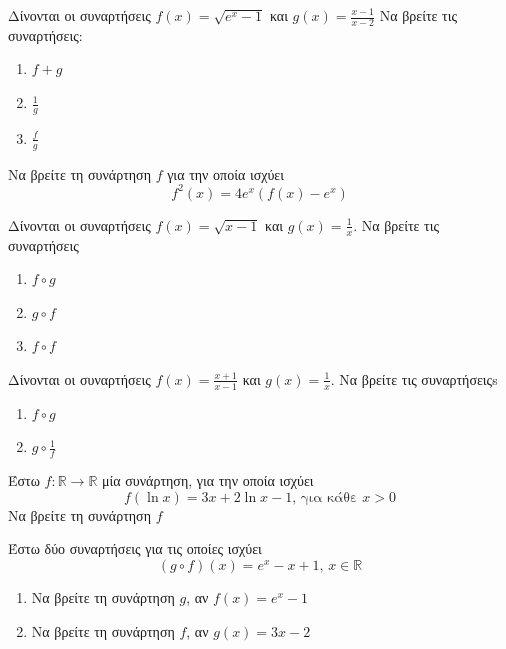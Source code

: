 \documentclass{presentation}
\begin{document}
\begin{askisi}
  Δίνονται οι συναρτήσεις $f(x)=\sqrt{e^x-1}$ και $g(x)=\frac{x-1}{x-2}$
  Να βρείτε τις συναρτήσεις:
  \begin{enumerate}
    \item<1-> $f+g$
    \item<2-> $\frac{1}{g}$
    \item<3-> $\frac{f}{g}$
  \end{enumerate}

\end{askisi}

\begin{askisi}
  Να βρείτε τη συνάρτηση $f$ για την οποία ισχύει
  $$f^2(x)=4e^x\left(f(x)-e^x\right)$$

\end{askisi}

\begin{askisi}
  Δίνονται οι συναρτήσεις $f(x)=\sqrt{x-1}$ και $g(x)=\frac{1}{x}$. Να βρείτε τις συναρτήσεις
  \begin{enumerate}
    \item<1-> $f\circ g$
    \item<2-> $g\circ f$
    \item<3-> $f\circ f$
  \end{enumerate}

\end{askisi}

\begin{askisi}
  Δίνονται οι συναρτήσεις $f(x)=\frac{x+1}{x-1}$ και $g(x)=\frac{1}{x}$. Να βρείτε τις συναρτήσειςs
  \begin{enumerate}
    \item<1-> $f\circ g$
    \item<2-> $g\circ \frac{1}{f}$
  \end{enumerate}

\end{askisi}

\begin{askisi}
  Έστω $f:\mathbb{R}\to\mathbb{R}$ μία συνάρτηση, για την οποία ισχύει
  $$f(\ln x)=3x+2\ln x -1\text{, για κάθε } x>0$$
  Να βρείτε τη συνάρτηση $f$

\end{askisi}

\begin{askisi}
  Έστω δύο συναρτήσεις για τις οποίες ισχύει
  $$(g\circ f)(x)=e^x-x+1\text{, } x\in\mathbb{R}$$
  \begin{enumerate}
    \item<1-> Να βρείτε τη συνάρτηση $g$, αν $f(x)=e^x-1$
    \item<2-> Να βρείτε τη συνάρτηση $f$, αν $g(x)=3x-2$
  \end{enumerate}

\end{askisi}
\end{document}
